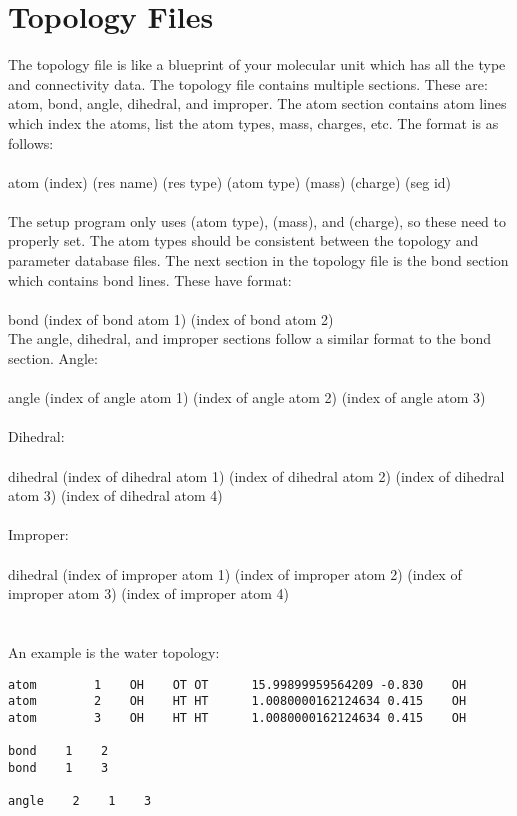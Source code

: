 \documentclass[12pt,letterpaper,]{article}
\begin{document}
\section{Topology Files}
The topology file is like a blueprint of your molecular unit which has all the type and connectivity data. The topology 
file contains multiple sections. These are: atom, bond, angle, dihedral, and improper. The atom section contains atom lines which index the atoms, list the atom types, mass, charges, etc. The format is as follows:\\
\\
atom     (index)  (res name)     (res type) (atom type)      (mass)   (charge)  (seg id)\\
\\
The setup program only uses (atom type), (mass), and (charge), so these need to properly set. The atom types should be consistent between the topology and parameter database files. The next section in the topology file is the bond section
which contains bond lines. These have format:\\
\\
bond (index of bond atom 1) (index of bond atom 2)
\\
The angle, dihedral, and improper sections follow a similar format to the bond section. Angle:\\
\\
angle (index of angle atom 1) (index of angle atom 2) (index of angle atom 3)\\
\\
Dihedral:\\
\\
dihedral (index of dihedral atom 1) (index of dihedral atom 2) (index of dihedral atom 3) (index of dihedral atom 4)\\
\\
Improper:\\
\\
dihedral (index of improper atom 1) (index of improper atom 2) (index of improper atom 3) (index of improper atom 4)\\
\\
\\
An example is the water topology:
\begin{verbatim}
atom        1    OH    OT OT      15.99899959564209 -0.830    OH
atom        2    OH    HT HT      1.0080000162124634 0.415    OH
atom        3    OH    HT HT      1.0080000162124634 0.415    OH
 
bond    1    2
bond    1    3
 
angle    2    1    3
\end{verbatim}
\end{document}
